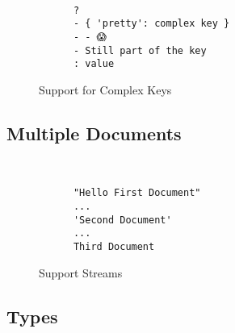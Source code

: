 \documentclass[a4paper, svgnames, 12pt]{article}
\begin{document}
\begin{figure}[H]
  \begin{minipage}[t]{0.48\textwidth}
    \vspace{0pt}
    \begin{bchart}[max=9, width=0.85\textwidth]
    \end{bchart}
  \end{minipage}
  \begin{minipage}[t]{0pt}~\end{minipage}
  \begin{minipage}[t]{0.48\textwidth}
    \vspace{0pt}
    \begin{verbatim}
      ?
      - { 'pretty': complex key }
      - - 😱
      - Still part of the key
      : value
    \end{verbatim}
  \end{minipage}
  \caption{Support for Complex Keys}
\end{figure}

\subsection{Multiple Documents}

\begin{figure}[H]
  \begin{minipage}[t]{0.48\textwidth}
    \vspace{0pt}
    \begin{bchart}[max=9, width=0.85\textwidth]
    \end{bchart}
  \end{minipage}
  \begin{minipage}[t]{0pt}~\end{minipage}
  \begin{minipage}[t]{0.48\textwidth}
    \vspace{0pt}
    \begin{verbatim}
      "Hello First Document"
      ...
      'Second Document'
      ...
      Third Document
    \end{verbatim}
  \end{minipage}
  \caption{Support Streams}
\end{figure}

\subsection{Types}
\end{document}
